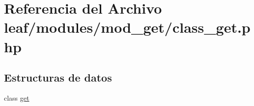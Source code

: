 \hypertarget{class__get_8php}{\section{Referencia del Archivo leaf/modules/mod\-\_\-get/class\-\_\-get.php}
\label{class__get_8php}
}
\subsection*{Estructuras de datos}
\begin{DoxyCompactItemize}
\item 
class \hyperlink{classget}{get}
\end{DoxyCompactItemize}
